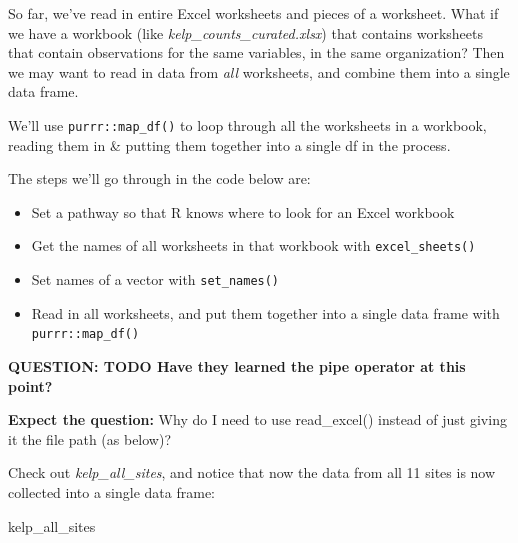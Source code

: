 \documentclass[]{book}
\newenvironment{Shaded}{\begin{snugshade}}{\end{snugshade}}
\newcommand{\KeywordTok}[1]{\textcolor[rgb]{0.13,0.29,0.53}{\textbf{#1}}}
\newcommand{\NormalTok}[1]{#1}
\newcommand{\OperatorTok}[1]{\textcolor[rgb]{0.81,0.36,0.00}{\textbf{#1}}}
\newcommand{\StringTok}[1]{\textcolor[rgb]{0.31,0.60,0.02}{#1}}
\providecommand{\tightlist}{%
  \setlength{\itemsep}{0pt}\setlength{\parskip}{0pt}}
\begin{document}
So far, we've read in entire Excel worksheets and pieces of a worksheet. What if we have a workbook (like \emph{kelp\_counts\_curated.xlsx}) that contains worksheets that contain observations for the same variables, in the same organization? Then we may want to read in data from \emph{all} worksheets, and combine them into a single data frame.

We'll use \texttt{purrr::map\_df()} to loop through all the worksheets in a workbook, reading them in \& putting them together into a single df in the process.

The steps we'll go through in the code below are:

\begin{itemize}
\tightlist
\item
  Set a pathway so that R knows where to look for an Excel workbook
\item
  Get the names of all worksheets in that workbook with \texttt{excel\_sheets()}
\item
  Set names of a vector with \texttt{set\_names()}
\item
  Read in all worksheets, and put them together into a single data frame with \texttt{purrr::map\_df()}
\end{itemize}

\textbf{QUESTION: TODO Have they learned the pipe operator at this point?}

\textbf{Expect the question:} Why do I need to use read\_excel() instead of just giving it the file path (as below)?

\begin{Shaded}
\end{Shaded}

Check out \emph{kelp\_all\_sites}, and notice that now the data from all 11 sites is now collected into a single data frame:

\begin{Shaded}
\begin{Highlighting}[]
\NormalTok{kelp_all_sites}
\end{Highlighting}
\end{Shaded}
\end{document}
